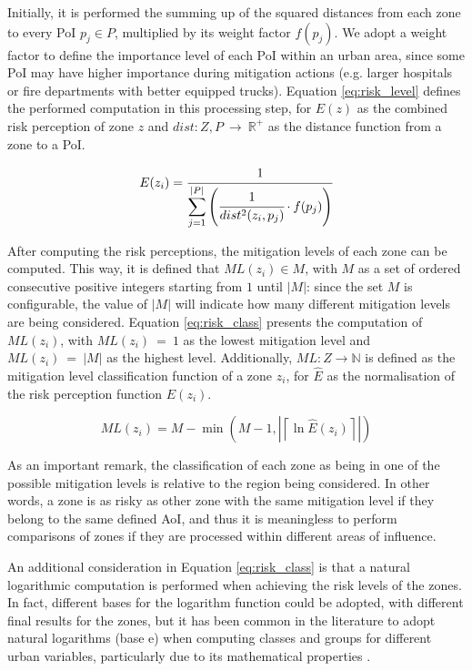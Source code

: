 \begin{refsection}
Initially, it is performed the summing up of the squared distances from each zone to every PoI $p_j \in P$, multiplied by its weight factor $f(p_j)$. We adopt a weight factor to define the importance level of each PoI within an urban area, since some PoI may have higher importance during mitigation actions (e.g. larger hospitals or fire departments with better equipped trucks). Equation \ref{eq:risk_level} defines the performed computation in this processing step, for $E(z)$ as the combined risk perception of zone $z$ and $dist:Z,P~\to~\mathbb{R^+}$ as the distance function from a zone to a PoI.

\begin{equation}
    \label{eq:risk_level}
    E(z_i) = \cfrac{1}{\displaystyle\sum_{j = 1}^{\lvert P \rvert}\left(\cfrac{1}{dist^2(z_i, p_j)} \cdot f(p_j)\right)} 
\end{equation}

After computing the risk perceptions, the mitigation levels of each zone can be computed. This way, it is defined that $ML(z_i) \in M$, with $M$ as a set of ordered consecutive positive integers starting from $1$ until $|M|$: since the set $M$ is configurable, the value of $|M|$ will indicate how many different mitigation levels are being considered. Equation \ref{eq:risk_class} presents the computation of $ML(z_i)$, with $ML(z_i)~=~1$ as the lowest mitigation level and $ML(z_i)~=~|M|$ as the highest level. Additionally, $ML:Z \to \mathbb{N}$ is defined as the mitigation level classification function of a zone $z_i$, for $\widehat{E}$ as the normalisation of the risk perception function $E(z_i)$. 

\begin{equation}
    \label{eq:risk_class}
    ML(z_i) = M - \min\left(M - 1, \left| \left\lceil \ln{\widehat{E}(z_i)} \right\rceil \right| \right)
\end{equation}

As an important remark, the classification of each zone as being in one of the possible mitigation levels is relative to the region being considered. In other words, a zone is as risky as other zone with the same mitigation level if they belong to the same defined AoI, and thus it is meaningless to perform comparisons of zones if they are processed within different areas of influence. 

An additional consideration in Equation \ref{eq:risk_class} is that a natural logarithmic computation is performed when achieving the risk levels of the zones. In fact, different bases for the logarithm function could be adopted, with different final results for the zones, but it has been common in the literature to adopt natural logarithms (base $\mathrm{e}$) when computing classes and groups for different urban variables, particularly due to its mathematical properties \cite{log3,log4,log1,log2}.


\end{refsection}
